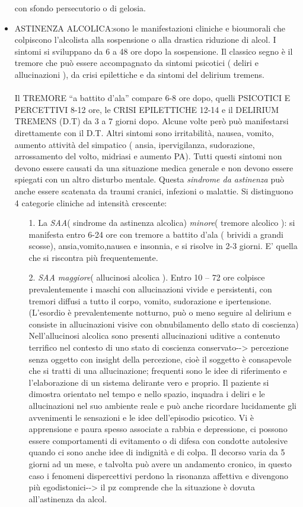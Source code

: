 \begin{itemize}
con sfondo persecutorio o di gelosia.
\item ASTINENZA ALCOLICA:sono le manifestazioni cliniche e bioumorali che
colpiscono l'alcolista alla sospensione o alla drastica riduzione di
alcol. I sintomi si sviluppano da 6 a 48 ore dopo la sospensione. Il
classico segno è il tremore che può essere accompagnato da sintomi
psicotici ( deliri e allucinazioni ), da crisi epilettiche e da sintomi
del delirium tremens.
\\\\
Il TREMORE ``a battito d'ala'' compare 6-8 ore dopo, quelli PSICOTICI E
PERCETTIVI 8-12 ore, le CRISI EPILETTICHE 12-14 e il DELIRIUM TREMENS
(D.T) da 3 a 7 giorni dopo. Alcune volte però può manifestarsi
direttamente con il D.T. Altri sintomi sono irritabilità, nausea,
vomito, aumento attività del simpatico ( ansia, ipervigilanza,
sudorazione, arrossamento del volto, midriasi e aumento PA). Tutti
questi sintomi non devono essere causati da una situazione medica
generale e non devono essere spiegati con un altro disturbo mentale.
Questa \emph{sindrome da astinenza} può anche essere scatenata da traumi
cranici, infezioni o malattie. Si distinguono 4 categorie cliniche ad
intensità crescente:

\begin{itemize}
\item[1.]
  La \emph{SAA}( sindrome da astinenza alcolica) \emph{minore}( tremore
  alcolico ): si manifesta entro 6-24 ore con tremore a battito d'ala (
  brividi a grandi scosse), ansia,vomito,nausea e insonnia, e si risolve
  in 2-3 giorni. E' quella che si riscontra più frequentemente.
\item[2.]
  \emph{SAA maggiore}( allucinosi alcolica ). Entro 10 -- 72 ore
  colpisce prevalentemente i maschi con allucinazioni vivide e
  persistenti, con tremori diffusi a tutto il corpo, vomito, sudorazione
  e ipertensione. (L'esordio è prevalentemente notturno, può o meno
  seguire al delirium e consiste in allucinazioni visive con
  obnubilamento dello stato di coscienza) Nell'allucinosi alcolica sono
  presenti allucinazioni uditive a contenuto terrifico nel contesto di
  uno stato di coscienza conservato-\/-\textgreater{} percezione senza
  oggetto con insight della percezione, cioè il soggetto è consapevole
  che si tratti di una allucinazione; frequenti sono le idee di
  riferimento e l'elaborazione di un sistema delirante vero e proprio.
  Il paziente si dimostra orientato nel tempo e nello spazio, inquadra i
  deliri e le allucinazioni nel suo ambiente reale e può anche ricordare
  lucidamente gli avvenimenti le sensazioni e le idee dell'episodio
  psicotico. Vi è apprensione e paura spesso associate a rabbia e
  depressione, ci possono essere comportamenti di evitamento o di difesa
  con condotte autolesive quando ci sono anche idee di indignità e di
  colpa. Il decorso varia da 5 giorni ad un mese, e talvolta può avere
  un andamento cronico, in questo caso i fenomeni dispercettivi perdono
  la risonanza affettiva e divengono più egodistonici-\/-\textgreater{}
  il pz comprende che la situazione è dovuta all'astinenza da alcol.
  

\end{itemize}
\end{itemize}
